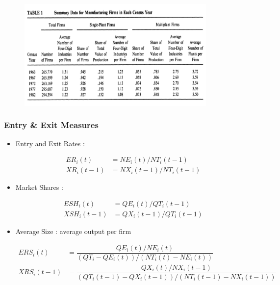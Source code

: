 \documentclass[dvipdfmx,12pt]{beamer}
\begin{document}
\begin{frame}

\begin{center}

\includegraphics[width=12cm,height=5.5cm]{DRS_T1.pdf}

\end{center}

\end{frame}

\begin{frame}\frametitle{Entry \& Exit Measures}

\footnotesize

 \begin{itemize}
 
 \item Entry and Exit Rates :
 
  \begin{align*}
  ER_i(t) &= NE_i(t)/NT_i(t-1) \\
  XR_i(t-1) & = NX_i(t-1) / NT_i(t-1)
  \end{align*} 
 
 \item Market Shares :
 
  \begin{align*}
  ESH_i(t) &=QE_i(t)/QT_i(t-1) \\
  XSH_i(t-1) &= QX_i(t-1) / QT_i(t-1)
  \end{align*}
 
 \item Average Size : average output per firm
 
  \begin{align*}
  ERS_i(t) &= \dfrac{QE_i(t)/NE_i(t)}{(QT_i-QE_i(t))/(NT_i(t) - NE_i(t))} \\
  XRS_i(t-1) &=\dfrac{QX_i(t)/NX_i(t-1)}{(QT_i(t-1)-QX_i(t-1))/(NT_i(t-1)-NX_i(t-1))}
  \end{align*}
 
 \end{itemize}

\large

\end{frame}
\end{document}
